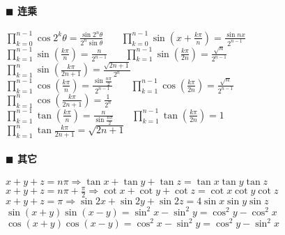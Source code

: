 \paragraph{$\blacksquare$ 连乘\\}
${\displaystyle \prod _{{k=0}}^{{n-1}}\cos 2^{k}\theta ={\frac  {\sin 2^{n}\theta }{2^{n}\sin \theta }}}$~~~
${\displaystyle \prod _{{k=0}}^{{n-1}}\sin \left(x+{\frac  {k\pi }{n}}\right)={\frac  {\sin nx}{2^{{n-1}}}}}$\\
${\displaystyle \prod _{{k=1}}^{{n-1}}\sin \left({\frac  {k\pi }{n}}\right)={\frac  {n}{2^{{n-1}}}}}$~~~
${\displaystyle \prod _{{k=1}}^{{n-1}}\sin \left({\frac  {k\pi }{2n}}\right)={\frac  {{\sqrt  {n}}}{2^{{n-1}}}}}$~~~
${\displaystyle \prod _{{k=1}}^{{n}}\sin \left({\frac  {k\pi }{2n+1}}\right)={\frac  {{\sqrt  {2n+1}}}{2^{n}}}}$\\
${\displaystyle \prod _{{k=1}}^{{n-1}}\cos \left({\frac  {k\pi }{n}}\right)={\frac  {\sin {\frac  {n\pi }{2}}}{2^{{n-1}}}}}$~~~
${\displaystyle \prod _{{k=1}}^{{n-1}}\cos \left({\frac  {k\pi }{2n}}\right)={\frac  {{\sqrt  {n}}}{2^{{n-1}}}}}$~~~
${\displaystyle \prod _{{k=1}}^{n}\cos \left({\frac  {k\pi }{2n+1}}\right)={\frac  {1}{2^{n}}}}$\\
${\displaystyle \prod _{{k=1}}^{{n-1}}\tan \left({\frac  {k\pi }{n}}\right)={\frac  {n}{\sin {\frac  {n\pi }{2}}}}}$~~~
${\displaystyle \prod _{{k=1}}^{{n-1}}\tan \left({\frac  {k\pi }{2n}}\right)=1}$~~~
${\displaystyle \prod _{{k=1}}^{n}\tan {\frac  {k\pi }{2n+1}}={\sqrt  {2n+1}}}$\\
\paragraph{$\blacksquare$ 其它\\}
$x+y+z=n\pi \Rightarrow \tan x+\tan y+\tan z=\tan x \tan y \tan z$\\
$x+y+z=n\pi +\frac{\pi}{2} \Rightarrow \cot x+\cot y+\cot z=\cot x \cot y \cot z$\\
$x+y+z=\pi \Rightarrow \sin 2x+\sin 2y+\sin 2z=4\sin x\sin y\sin z$\\
$\sin(x+y)\sin(x-y)=\sin ^{2}{x}-\sin ^{2}{y}=\cos ^{2}{y}-\cos ^{2}{x}$\\
$\cos(x+y)\cos(x-y)=\cos ^{2}{x}-\sin ^{2}{y}=\cos ^{2}{y}-\sin ^{2}{x}$


